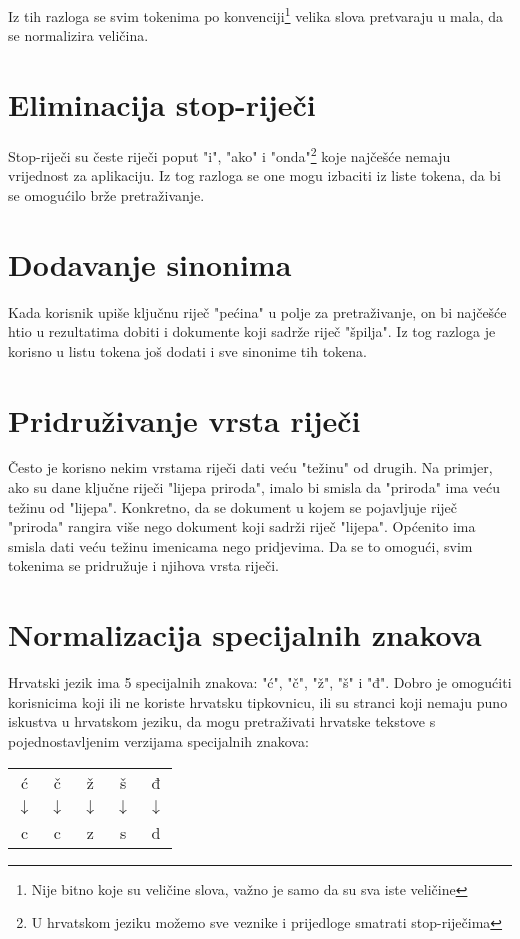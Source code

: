\documentclass[11pt]{scrreprt}
\begin{document}
Iz tih razloga se svim tokenima po konvenciji\footnote{Nije bitno koje su veličine slova, važno je samo da su sva iste veličine} velika slova pretvaraju u mala, da se normalizira veličina.

\section{Eliminacija stop-riječi}

Stop-riječi su česte riječi poput "i", "ako" i "onda"\footnote{U hrvatskom jeziku možemo sve veznike i prijedloge smatrati stop-riječima} koje najčešće nemaju vrijednost za aplikaciju. Iz tog razloga se one mogu izbaciti iz liste tokena, da bi se omogućilo brže pretraživanje.

\section{Dodavanje sinonima}

Kada korisnik upiše ključnu riječ "pećina" u polje za pretraživanje, on bi najčešće htio u rezultatima dobiti i dokumente koji sadrže riječ "špilja". Iz tog razloga je korisno u listu tokena još dodati i sve sinonime tih tokena.

\section{Pridruživanje vrsta riječi}

Često je korisno nekim vrstama riječi dati veću "težinu" od drugih. Na primjer, ako su dane ključne riječi "lijepa priroda", imalo bi smisla da "priroda" ima veću težinu od "lijepa". Konkretno, da se dokument u kojem se pojavljuje riječ "priroda" rangira više nego dokument koji sadrži riječ "lijepa". Općenito ima smisla dati veću težinu imenicama nego pridjevima. Da se to omogući, svim tokenima se pridružuje i njihova vrsta riječi.

\section{Normalizacija specijalnih znakova}

Hrvatski jezik ima 5 specijalnih znakova: "ć", "č", "ž", "š" i "đ". Dobro je omogućiti korisnicima koji ili ne koriste hrvatsku tipkovnicu, ili su stranci koji nemaju puno iskustva u hrvatskom jeziku, da mogu pretraživati hrvatske tekstove s pojednostavljenim verzijama specijalnih znakova:

\begin{center}
  \begin{tabular}{ccccc}
    ć            & č            & ž            & š            & đ            \\
    $\downarrow$ & $\downarrow$ & $\downarrow$ & $\downarrow$ & $\downarrow$ \\
    c            & c            & z            & s            & d            \\
  \end{tabular}
\end{center}
\end{document}
